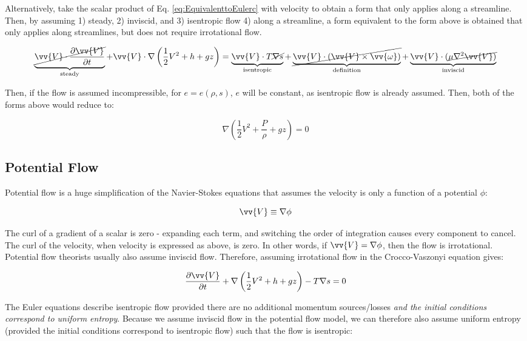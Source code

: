 \documentclass[10pt]{article}
\newcommand{\beq}{\begin{equation}}
\newcommand{\eeq}{\end{equation}}
\begin{document}
\begin{flushleft}
Alternatively, take the scalar product of Eq. \ref{eq:EquivalenttoEulerc} with velocity to obtain a form that only applies along a streamline. Then, by assuming 1) steady, 2) inviscid, and 3) isentropic flow 4) along a streamline, a form equivalent to the form above is obtained that only applies along streamlines, but does not require irrotational flow.

\beq
\label{eq:Bernoulli2}
\underbrace{\cancel{\vv{V}\cdot\frac{\partial \vv{V}}{\partial t}}}_{\text{steady}}+\vv{V}\cdot\nabla\left(\frac{1}{2}V^2+h+gz\right)=\underbrace{\vv{V}\cdot T\cancel{\nabla s}}_{\text{isentropic}}+\underbrace{\cancel{\vv{V}\cdot(\vv{V}\times\vv{\omega})}}_{\text{definition}}+\underbrace{\vv{V}\cdot(\cancel{\mu\nabla^2\vv{V})}}_{\text{inviscid}}
\eeq

Then, if the flow is assumed incompressible, for \(e=e(\rho,s)\), \(e\) will be constant, as isentropic flow is already assumed. Then, both of the forms above would reduce to:

\beq
\label{eq:Bernoulli3}
\nabla\left(\frac{1}{2}V^2+\frac{P}{\rho}+gz\right)=0
\eeq


\subsection{Potential Flow}
Potential flow is a huge simplification of the Navier-Stokes equations that assumes the velocity is only a function of a potential \(\phi\):

\beq
\vv{V}\equiv\nabla\phi
\eeq

The curl of a gradient of a scalar is zero - expanding each term, and switching the order of integration causes every component to cancel. The curl of the velocity, when velocity is expressed as above, is zero. In other words, if \(\vv{V}=\nabla\phi\), then the flow is irrotational. Potential flow theorists usually also assume inviscid flow. Therefore, assuming irrotational flow in the Crocco-Vaszonyi equation gives:

\beq
\frac{\partial \vv{V}}{\partial t}+\nabla\left(\frac{1}{2}V^2+h+gz\right)-T\nabla s=0
\eeq

The Euler equations describe isentropic flow provided there are no additional momentum sources/losses {\it and the initial conditions correspond to uniform entropy}. Because we assume inviscid flow in the potential flow model, we can therefore also assume uniform entropy (provided the initial conditions correspond to isentropic flow) such that the flow is isentropic:


\end{flushleft}
\end{document}

